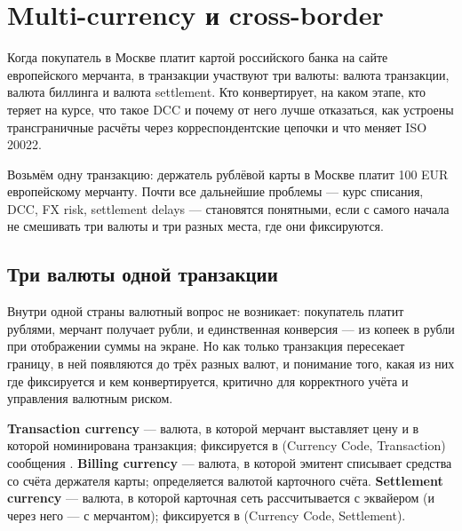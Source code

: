 \chapter{Multi-currency и cross-border}
\label{ch:multicurrency}

\begin{kaobox}[title=Что вы узнаете из этой главы]
  Когда покупатель в Москве платит картой российского банка
  на сайте европейского мерчанта, в транзакции участвуют три
  валюты: валюта транзакции, валюта биллинга и валюта settlement.
  Кто конвертирует, на каком этапе, кто теряет на курсе,
  что такое DCC и почему от него лучше отказаться,
  как устроены трансграничные расчёты через корреспондентские
  цепочки и что меняет ISO 20022.
\end{kaobox}

Возьмём одну транзакцию: держатель рублёвой карты в Москве платит
100 EUR европейскому мерчанту. Почти все дальнейшие проблемы —
курс списания, DCC, FX risk, settlement delays — становятся
понятными, если с самого начала не смешивать три валюты и три
разных места, где они фиксируются.

\section{Три валюты одной транзакции}
\label{sec:mc-currencies}

Внутри одной страны валютный вопрос не возникает: покупатель
платит рублями, мерчант получает рубли, и единственная конверсия —
из копеек в рубли при отображении суммы на экране. Но как только
транзакция пересекает границу, в ней появляются до трёх разных
валют, и понимание того, какая из них где фиксируется и кем
конвертируется, критично для корректного учёта и управления
валютным риском.

\begin{kaobox}[title={Определение: Transaction, billing и settlement currency}, colback=blue!4, colbacktitle=blue!15]
  \textbf{Transaction currency} — валюта, в которой мерчант
  выставляет цену и в которой номинирована транзакция;
  фиксируется в  (Currency Code, Transaction)
  сообщения .
  \textbf{Billing currency} — валюта, в которой эмитент
  списывает средства со счёта держателя карты; определяется
  валютой карточного счёта.
  \textbf{Settlement currency} — валюта, в которой карточная
  сеть рассчитывается с эквайером (и через него — с мерчантом);
  фиксируется в  (Currency Code, Settlement).
\end{kaobox}

